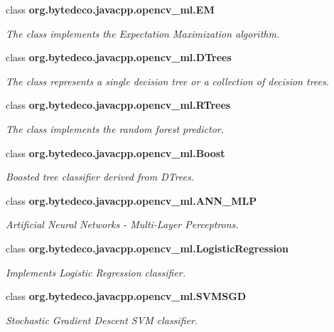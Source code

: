 \begin{DoxyCompactItemize}
class {\bfseries org.\+bytedeco.\+javacpp.\+opencv\+\_\+ml.\+EM}
\begin{DoxyCompactList}\small\item\em The class implements the Expectation Maximization algorithm. \end{DoxyCompactList}\item 
class {\bfseries org.\+bytedeco.\+javacpp.\+opencv\+\_\+ml.\+D\+Trees}
\begin{DoxyCompactList}\small\item\em The class represents a single decision tree or a collection of decision trees. \end{DoxyCompactList}\item 
class {\bfseries org.\+bytedeco.\+javacpp.\+opencv\+\_\+ml.\+R\+Trees}
\begin{DoxyCompactList}\small\item\em The class implements the random forest predictor. \end{DoxyCompactList}\item 
class {\bfseries org.\+bytedeco.\+javacpp.\+opencv\+\_\+ml.\+Boost}
\begin{DoxyCompactList}\small\item\em Boosted tree classifier derived from D\+Trees. \end{DoxyCompactList}\item 
class {\bfseries org.\+bytedeco.\+javacpp.\+opencv\+\_\+ml.\+A\+N\+N\+\_\+\+M\+LP}
\begin{DoxyCompactList}\small\item\em Artificial Neural Networks -\/ Multi-\/\+Layer Perceptrons. \end{DoxyCompactList}\item 
class {\bfseries org.\+bytedeco.\+javacpp.\+opencv\+\_\+ml.\+Logistic\+Regression}
\begin{DoxyCompactList}\small\item\em Implements Logistic Regression classifier. \end{DoxyCompactList}\item 
class {\bfseries org.\+bytedeco.\+javacpp.\+opencv\+\_\+ml.\+S\+V\+M\+S\+GD}
\begin{DoxyCompactList}\small\item\em Stochastic Gradient Descent S\+VM classifier. \end{DoxyCompactList}\end{DoxyCompactItemize}

